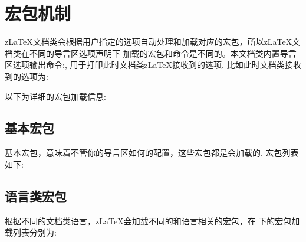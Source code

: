 \section{宏包机制}
z\LaTeX{}文档类会根据用户指定的选项自动处理和加载对应的宏包，所以z\LaTeX{}文档类在不同的导言区选项声明下
加载的宏包和命令是不同的。本文档类内置导言区选项输出命令:\cmd{\zlatexOptions}\index{\cmd{\zlatexOptions}},
用于打印此时文档类z\LaTeX{}接收到的选项. 比如此时文档类接收到的选项为: 
\begin{center}
    \zlatexOptions
\end{center}

以下为详细的宏包加载信息:

\subsection{基本宏包}
基本宏包，意味着不管你的导言区如何的配置，这些宏包都是会加载的. 宏包列表如下:

\begin{table}[H]
    \caption{z\LaTeX{}文档类基本宏包}
    \label{tab:basic-package}
\end{table}

\subsection{语言类宏包}
根据不同的文档类语言，z\LaTeX{}会加载不同的和语言相关的宏包，在
下的宏包加载列表分别为:

\begin{table}[H]
    \caption{z\LaTeX{}文档类语言宏包}
    \label{tab:lang-package}
\end{table}

